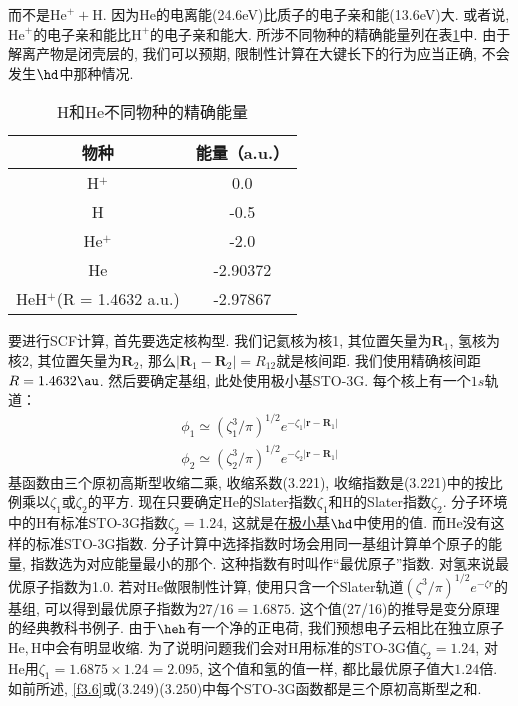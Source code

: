 而不是$\mathrm{He}^+ + \mathrm{H}$. 因为$\mathrm{He}$的电离能(24.6eV)比质子的电子亲和能(13.6eV)大. 或者说, $\mathrm{He}^+$的电子亲和能比$\mathrm{H}^+$的电子亲和能大. 所涉不同物种的精确能量列在表\ref{t3.4}中. 由于解离产物是闭壳层的, 我们可以预期, 限制性\hft 计算在大键长下的行为应当正确, 不会发生$\hd$中那种情况. 
\begin{table}[H]
	\centering
	\caption{H和He不同物种的精确能量}
	\begin{tabular}{cc}
		\hline
		物种 & 能量（a.u.）\\\hline
		H$^+$      & 0.0\\
		H     & -0.5\\
		He$^+$     & -2.0\\
		He     & -2.90372\\
		HeH$^+$(R = 1.4632 a.u.)&-2.97867\\\hline
	\end{tabular}
	\label{t3.4}
\end{table}
要进行SCF计算, 首先要选定核构型. 我们记氦核为核1, 其位置矢量为$\mathbf{R}_1$, 氢核为核2, 其位置矢量为$\mathbf{R}_2$, 那么$|\mathbf{R}_1-\mathbf{R}_2|=R_{12}$就是核间距. 我们使用精确核间距$R=1.4632\au$. 然后要确定基组, 此处使用极小基STO-3G. 每个核上有一个$1s$轨道：
\begin{align}
\phi_1 \simeq (\zeta_1^3/\pi)^{1/2} e^{-\zeta_1|\mathbf{r-R}_1|}\\
\phi_2 \simeq (\zeta_2^3/\pi)^{1/2} e^{-\zeta_2|\mathbf{r-R}_1|}
\end{align}
基函数由三个原初高斯型收缩二乘, 收缩系数(3.221), 收缩指数是(3.221)中的按比例乘以$\zeta_1$或$\zeta_2$的平方. 现在只要确定$\mathrm{He}$的Slater指数$\zeta_1$和$\mathrm{H}$的Slater指数$\zeta_2$. 分子环境中的$\mathrm{H}$有标准STO-3G指数$\zeta_2=1.24$, 这就是在\underline{极小基$\hd$}中使用的值. 而$\mathrm{He}$没有这样的标准STO-3G指数. 分子计算中选择指数时场会用同一基组计算单个原子的能量, 指数选为对应能量最小的那个. 这种指数有时叫作``最优原子''指数. 对氢来说最优原子指数为1.0. 若对$\mathrm{He}$做限制性\hft 计算, 使用只含一个Slater轨道$(\zeta^3/\pi)^{1/2}e^{-\zeta r}$的基组, 可以得到最优原子指数为$27/16=1.6875$. 这个值(27/16)的推导是变分原理的经典教科书例子. 由于$\heh$有一个净的正电荷, 我们预想电子云相比在独立原子$\mathrm{He,H}$中会有明显收缩. 为了说明问题我们会对$\mathrm{H}$用标准的STO-3G值$\zeta_2=1.24$, 对$\mathrm{He}$用$\zeta_1=1.6875\times 1.24=2.095$, 这个值和氢的值一样, 都比最优原子值大$1.24$倍. 如前所述, \ref{f3.6}或(3.249)(3.250)中每个STO-3G函数都是三个原初高斯型之和.

